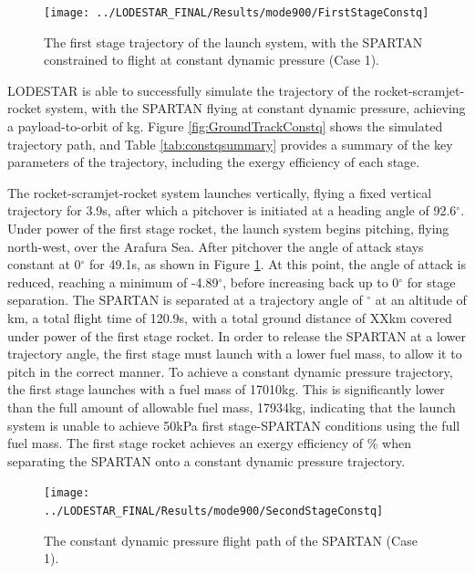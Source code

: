 \begin{figure}[ht!]
	\centering
	\texttt{[image: ../LODESTAR\_FINAL/Results/mode900/FirstStageConstq]}
	\caption{The first stage trajectory of the launch system, with the SPARTAN constrained to flight at constant dynamic pressure (Case 1).}
	\label{fig:FirstStageConstq}
\end{figure}
LODESTAR is able to successfully simulate the trajectory of the rocket-scramjet-rocket system, with the SPARTAN flying at constant dynamic pressure, achieving a payload-to-orbit of \PayloadToOrbitConstq kg.
Figure \ref{fig:GroundTrackConstq} shows the simulated trajectory path, and Table \ref{tab:constqsummary} provides a summary of the key parameters of the trajectory, including the exergy efficiency of each stage.


The rocket-scramjet-rocket system launches vertically, flying a fixed vertical trajectory for 3.9s, after which a pitchover is initiated at a heading angle of 92.6$^\circ$. Under power of the first stage rocket, the launch system begins pitching, flying north-west, over the Arafura Sea. 
After pitchover the angle of attack stays constant at 0$^\circ$ for 49.1s, as shown in Figure \ref{fig:FirstStageConstq}. At this point, the angle of attack is reduced, reaching a minimum of -4.89$^\circ$, before increasing back up to 0$^\circ$ for stage separation. 
The SPARTAN is separated at a trajectory angle of \firstsecondSeparationgammaConstq$^\circ$ at an altitude of \firstsecondSeparationAltConstq km, a total flight time of 120.9s, with a total ground distance of XXkm covered under power of the first stage rocket. 
 In order to release the SPARTAN at a lower trajectory angle, the first stage must launch with a lower fuel mass, to allow it to pitch in the correct manner. To achieve a constant dynamic pressure trajectory, the first stage launches with a fuel mass of 17010kg. This is significantly lower than the full amount of allowable fuel mass, 17934kg, indicating that the launch system is unable to achieve 50kPa first stage-SPARTAN conditions using the full fuel mass. 
The first stage rocket achieves an exergy efficiency of \firstExergyEffConstq \% when separating the SPARTAN onto a constant dynamic pressure trajectory. 


\begin{figure}[ht!]
\centering
\texttt{[image: ../LODESTAR\_FINAL/Results/mode900/SecondStageConstq]}
\caption{The constant dynamic pressure flight path of the SPARTAN (Case 1).}
\label{fig:SecondStageConstq}
\end{figure}


